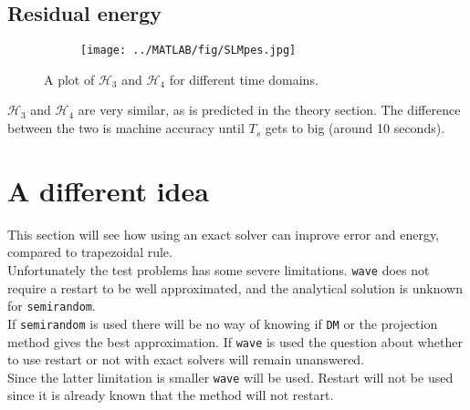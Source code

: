 \subsection{Residual energy}%
\label{sec:residualenergy}
\begin{figure}[H]
        \centering
        \begin{subfigure}[b]{0.45\textwidth}
                \texttt{[image: ../MATLAB/fig/SLMpes.jpg]}
        \end{subfigure}
		
        \caption{ A plot of $\mathcal{H}_3$ and $\mathcal{H}_4$ for different time domains. }
        \label{fig:SLMpes}
\end{figure}
$\mathcal{H}_3$ and $\mathcal{H}_4$ are very similar, as is predicted in the theory section. The difference between the two is machine accuracy until $T_s$ gets to big (around 10 seconds). \\
\section{A different idea} %
This section will see how using an exact solver can improve error and energy, compared to trapezoidal rule.\\
Unfortunately the test problems has some severe limitations. \texttt{wave} does not require a restart to be well approximated, and the analytical solution is unknown for \texttt{semirandom}. \\
If \texttt{semirandom} is used there will be no way of knowing if \texttt{DM} or the projection method gives the best approximation.
If \texttt{wave} is used the question about whether to use restart or not with exact solvers will remain unanswered. \\
Since the latter limitation is smaller
\texttt{wave} will be used. Restart will not be used since it is already known that the method will not restart.

